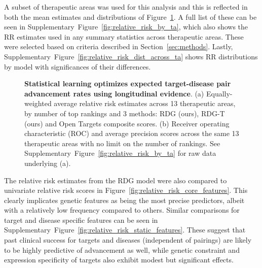 \documentclass{article}
\begin{document}
A subset of therapeutic areas was used for this analysis and this is reflected in both the mean estimates and distributions of Figure~\ref{fig:performance_across_ta}. A full list of these can be seen in Supplementary~Figure~\ref{fig:relative_risk_by_ta}, which also shows the RR estimates used in any summary statistics across therapeutic areas. These were selected based on criteria described in Section~\ref{sec:methods}. Lastly, Supplementary~Figure~\ref{fig:relative_risk_dist_across_ta} shows RR distributions by model with significances of their differences.

\begin{figure}[!htb]
  \centering
  \captionsetup{width=.9\linewidth}
  \qquad
  \caption{
    \textbf{Statistical learning optimizes expected target-disease pair advancement rates using longitudinal evidence}.
    (a) Equally-weighted average relative risk estimates across 13 therapeutic areas, by number of top rankings and 3 methods: RDG (ours), RDG-T (ours) and Open Targets composite scores. 
    (b) Receiver operating characteristic (ROC) and average precision scores across the same 13 therapeutic areas with no limit on the number of rankings. 
    See Supplementary~Figure~\ref{fig:relative_risk_by_ta} for raw data underlying (a).
  }
  \label{fig:performance_across_ta}
\end{figure}

The relative risk estimates from the RDG model were also compared to univariate relative risk scores in Figure~\ref{fig:relative_risk_core_features}. This clearly implicates genetic features as being the most precise predictors, albeit with a relatively low frequency compared to others. Similar comparisons for target and disease specific features can be seen in Supplementary~Figure~\ref{fig:relative_risk_static_features}. These suggest that past clinical success for targets and diseases (independent of pairings) are likely to be highly predictive of advancement as well, while genetic constraint and expression specificity of targets also exhibit modest but significant effects.
\end{document}

